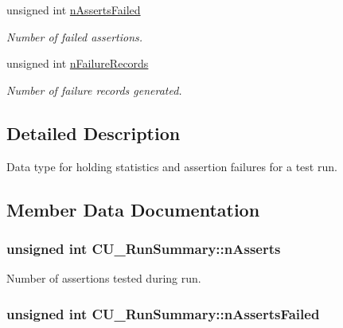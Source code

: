 \begin{DoxyCompactItemize}
unsigned int \hyperlink{struct_c_u___run_summary_ad5e24306584ab2f165a435b648513b9c}{n\+Asserts\+Failed}
\begin{DoxyCompactList}\small\item\em Number of failed assertions. \end{DoxyCompactList}\item 
unsigned int \hyperlink{struct_c_u___run_summary_a1a2d40200bf4a3f15fd94f4f0e1faa40}{n\+Failure\+Records}
\begin{DoxyCompactList}\small\item\em Number of failure records generated. \end{DoxyCompactList}\end{DoxyCompactItemize}


\subsection{Detailed Description}
Data type for holding statistics and assertion failures for a test run. 



\subsection{Member Data Documentation}
\hypertarget{struct_c_u___run_summary_a90899c9309e2b4374443a7d5ab226a90}{
\subsubsection[{n\+Asserts}]{\setlength{\rightskip}{0pt plus 5cm}unsigned int C\+U\+\_\+\+Run\+Summary\+::n\+Asserts}}\label{struct_c_u___run_summary_a90899c9309e2b4374443a7d5ab226a90}


Number of assertions tested during run. 

\hypertarget{struct_c_u___run_summary_ad5e24306584ab2f165a435b648513b9c}{
\subsubsection[{n\+Asserts\+Failed}]{\setlength{\rightskip}{0pt plus 5cm}unsigned int C\+U\+\_\+\+Run\+Summary\+::n\+Asserts\+Failed}}\label{struct_c_u___run_summary_ad5e24306584ab2f165a435b648513b9c}


